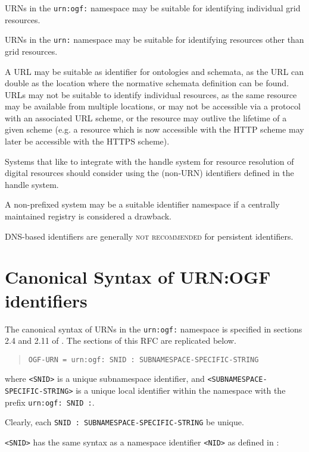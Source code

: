 \documentclass[12pt]{article}  %
\begin{document}
URNs in the \texttt{urn:ogf:} namespace may be suitable for identifying individual 
grid resources.

URNs in the \texttt{urn:} namespace may be suitable for identifying resources other 
than grid resources.

A URL may be suitable as identifier for ontologies and schemata,
as the URL can double as the location where the normative schemata definition
can be found. URLs may not be suitable to identify individual resources, as the
same resource may be available from multiple locations, or may not be accessible 
via a protocol with an associated URL scheme, or the resource may outlive the 
lifetime of a given scheme (e.g. a resource which is now accessible with the HTTP 
scheme may later be accessible with the HTTPS scheme).

Systems that like to integrate with the handle system for resource resolution
of digital resources should consider using the (non-URN) identifiers defined in 
the handle system.

A non-prefixed system may be a suitable identifier namespace if a centrally 
maintained registry is considered a drawback.

DNS-based identifiers are generally \textsc{not recommended} for persistent 
identifiers.

\section{Canonical Syntax of URN:OGF identifiers}%
\label{sec:syntax}

The canonical syntax of URNs in the \texttt{urn:ogf:} namespace is specified 
in sections 2.4 and 2.11 of \cite{rfc6453}. 
The sections of this RFC are replicated below.

\begin{quote}
  \texttt{OGF-URN  =  \qq{}urn:ogf:\qq{} SNID \qq{}:\qq{} SUBNAMESPACE-SPECIFIC-STRING}
\end{quote}

where \texttt{<SNID>} is a unique subnamespace identifier, and 
\texttt{<SUBNAMESPACE-SPECIFIC-STRING>} is a unique local identifier within the 
namespace with the prefix \texttt{\qq{}urn:ogf:\qq{} SNID \qq{}:\qq{}}.

Clearly, each \texttt{SNID \qq{}:\qq{} SUBNAMESPACE-SPECIFIC-STRING} \MUST{} be unique.

\texttt{<SNID>} has the same syntax as a namespace identifier \texttt{<NID>} 
as defined in \cite{rfc2141}:
\end{document}
